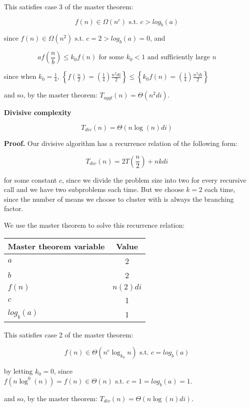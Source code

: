 \documentclass[../tech_report_1.tex]{subfiles}
\begin{document}
This satisfies case 3 of the master theorem:

$$ f(n) \in \Omega(n^c) \text{ s.t. } c > log_b(a) $$

since $f(n) \in \Omega(n^2) \text{ s.t. } c = 2 > log_b(a) = 0$, and

$$ af(\frac{n}{b}) \leq k_0 f(n) \text{ for some } k_0 < 1 \text{ and sufficiently large } n$$

since when  $k_0 = \frac{1}{4}$, $\left\{f(\frac{n}{2}) = (\frac{1}{4}) \frac{n^2di}{2}\right\} \leq \left\{k_0f(n) = (\frac{1}{4}) \frac{n^2di}{2}\right\}$

and so, by the master theorem: $ T_{aggl}(n) = \Theta(n^2di)$. \qedsymbol


\begin{theorem} 

\textbf{Divisive complexity}

$$ T_{div}(n) = \Theta(n\log(n)di) $$

\end{theorem}

\textbf{Proof.} Our divisive algorithm has a recurrence relation of the following form:

$$ T_{div}(n) = 2T(\frac{n}{2}) + nkdi $$

for some constant $c$, since we divide the problem size into two for every recursive call and we have two subproblems each time. But we choose $k=2$ each time, since the number of means we choose to cluster with is always the branching factor.

We use the master theorem \cite{thomas2001introduction} to solve this recurrence relation:

\begin{table}[ht]
\centering
\begin{tabular}{l || c }
\hline
\textbf{Master theorem variable} & \textbf{Value} \\
\hline
$a$ & 2 \\
$b$ & 2 \\
$f(n)$ & ${n(2)di}$ \\
$c$ & 1 \\
$log_b(a)$ & 1 \\
\hline
\end{tabular}
\end{table}

This satisfies case 2 of the master theorem:

$$ f(n) \in \Theta(n^c\log_{k_{0}}n) \text{ s.t. } c = log_b(a) $$

by letting $k_0=0$, since $f(n\log^0(n)) = f(n) \in \Theta(n) \text{ s.t. } c = 1 = log_b(a) = 1$.

and so, by the master theorem: $ T_{div}(n) = \Theta(n\log(n)di)$. \qedsymbol
\end{document}
